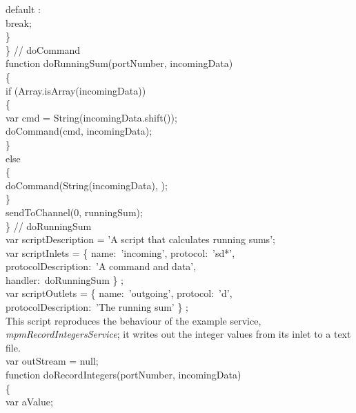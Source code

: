 \tS\tS{}default :\\
\tS\tS\tS{}break;\\
            
\tS\}\\
\} // doCommand\\
\newpage
function doRunningSum(portNumber, incomingData)\\
\{\\
\tS{}if (Array.isArray(incomingData))\\
\tS\{\\
\tS\tS{}var cmd = String(incomingData.shift());\\
        
\tS\tS{}doCommand(cmd, incomingData);\\
\tS\}\\
\tS{}else\\
\tS\{\\
\tS\tS{}doCommand(String(incomingData), \openSq\closeSq);\\
\tS\}\\
\tS{}sendToChannel(0, runningSum);\\
\} // doRunningSum\\

var scriptDescription = 'A script that calculates running sums';\\

var scriptInlets = \openSq{} \{ name:\ 'incoming', protocol:\ 'sd*',\\
\tS\tS\tS\tS\tS\tS\tS\tS\tS\tS{}protocolDescription:\ 'A command and data',\\
\tS\tS\tS\tS\tS\tS\tS\tS\tS\tS{}handler:\ doRunningSum \} \closeSq;\\

var scriptOutlets = \openSq{} \{ name:\ 'outgoing', protocol:\ 'd',\\
\tS\tS\tS\tS\tS\tS\tS\tS\tS\tS{}protocolDescription:\ 'The running sum' \} \closeSq;\\
\codeEnd{}
\secondaryEnd{}
\newpage
{}
This script reproduces the behaviour of the example service,
\emph{mpmRecordIntegersService}; it writes out the integer values from its inlet to a text
file.\\

\codeBegin{}
var outStream = null;\\

function doRecordIntegers(portNumber, incomingData)\\
\{\\
\tS{}var aValue;\\
    
